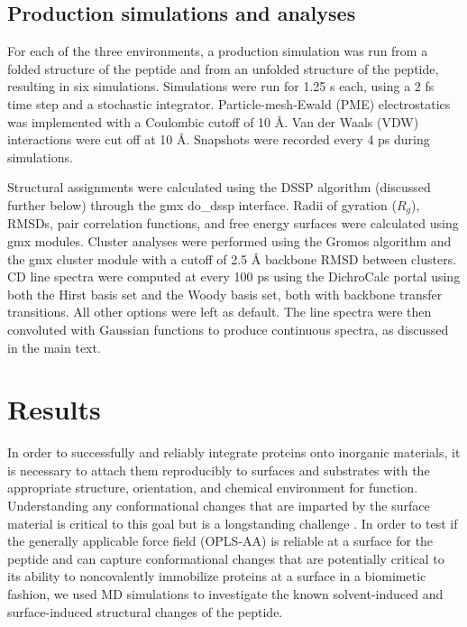 \subsection{Production simulations and analyses}

For each of the three environments, a production simulation was run from a folded structure of the peptide and from an unfolded structure of the peptide, resulting in six simulations. 
Simulations were run for 1.25 \textmu{}s each, using a 2 fs time step and a stochastic integrator. Particle-mesh-Ewald (PME) electrostatics was implemented with a Coulombic cutoff of 10 \si{\angstrom}. 
Van der Waals (VDW) interactions were cut off at 10 \si{\angstrom}. 
Snapshots were recorded every 4 ps during simulations.

Structural assignments were calculated using the DSSP algorithm (discussed further below)\cite{Kabsch1983, Joosten2011} through the gmx do\_dssp interface. 
Radii of gyration ($R_g$), RMSDs, pair correlation functions, and free energy surfaces were calculated using gmx modules. 
Cluster analyses were performed using the Gromos algorithm\cite{Daura1999} and the gmx cluster module with a cutoff of 2.5 \si{\angstrom} backbone RMSD between clusters. 
CD line spectra were computed at every 100 ps using the DichroCalc portal\cite{Bulheller2009, Jasim2018} using both the Hirst basis set\cite{Hirst1998, Besley1999} and the Woody basis set\cite{Woody1999}, both with backbone transfer transitions. 
All other options were left as default. 
The line spectra were then convoluted with Gaussian functions to produce continuous spectra, as discussed in the main text.

\section{Results}

In order to successfully and reliably integrate proteins onto inorganic materials, it is necessary to attach them reproducibly to surfaces and substrates with the appropriate structure, orientation, and chemical environment for function. 
Understanding any conformational changes that are imparted by the surface material is critical to this goal but is a longstanding challenge \cite{Hlady1996, Castner2002, Latour2005biomaterials}.
In order to test if the generally applicable force field (OPLS-AA) is reliable at a surface for the \pep{} peptide and can capture conformational changes that are potentially critical to its ability to noncovalently immobilize proteins at a surface in a biomimetic fashion, we used MD simulations to investigate the known solvent-induced and surface-induced structural changes of the peptide.

